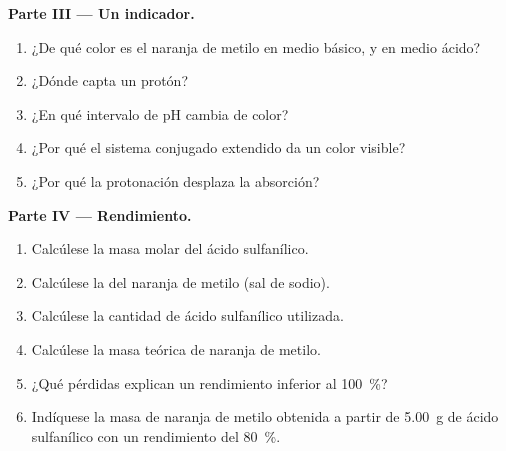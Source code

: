 \begin{problem}
\medskip
\noindent\textbf{Parte III --- Un indicador.}
\begin{enumerate}[resume]
  \item ¿De qué color es el naranja de metilo en medio básico, y en medio ácido?
  \item ¿Dónde capta un protón?
  \item ¿En qué intervalo de pH cambia de color?
  \item ¿Por qué el sistema conjugado extendido da un color visible?
  \item ¿Por qué la protonación desplaza la absorción?
\end{enumerate}

\medskip
\noindent\textbf{Parte IV --- Rendimiento.}
\begin{enumerate}[resume]
  \item Calcúlese la masa molar del ácido sulfanílico.
  \item Calcúlese la del naranja de metilo (sal de sodio).
  \item Calcúlese la cantidad de ácido sulfanílico utilizada.
  \item Calcúlese la masa teórica de naranja de metilo.
  \item ¿Qué pérdidas explican un rendimiento inferior al 100~\%?
  \item Indíquese la masa de naranja de metilo obtenida a partir de \qty{5.00}{g} de ácido sulfanílico con un rendimiento
        del 80~\%.
\end{enumerate}
\end{problem}
